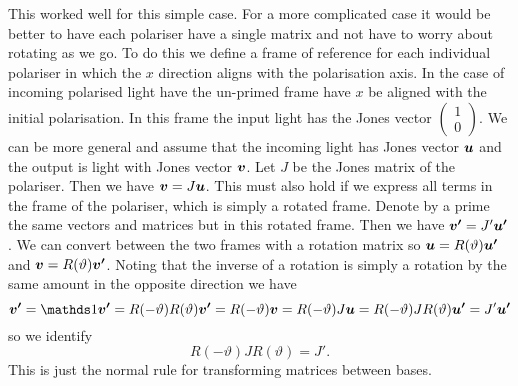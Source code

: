     This worked well for this simple case.
    For a more complicated case it would be better to have each polariser have a single matrix and not have to worry about rotating as we go.
    To do this we define a frame of reference for each individual polariser in which the \(x\) direction aligns with the polarisation axis.
    In the case of incoming polarised light have the un-primed frame have \(x\) be aligned with the initial polarisation.
    In this frame the input light has the Jones vector \(\left( \begin{smallmatrix} 1\\ 0 \end{smallmatrix} \right)\).
    We can be more general and assume that the incoming light has Jones vector \(\bm{u}\) and the output is light with Jones vector \(\bm{v}\).
    Let \(J\) be the Jones matrix of the polariser.
    Then we have \(\bm{v} = J\bm{u}\).
    This must also hold if we express all terms in the frame of the polariser, which is simply a rotated frame.
    Denote by a prime the same vectors and matrices but in this rotated frame.
    Then we have \(\bm{v'} = J'\bm{u'}\).
    We can convert between the two frames with a rotation matrix so \(\bm{u} = R(\vartheta)\bm{u'}\) and \(\bm{v} = R(\vartheta)\bm{v'}\).
    Noting that the inverse of a rotation is simply a rotation by the same amount in the opposite direction we have
    \[\vv{v'} = \ident \vv{v'} = R(-\vartheta)R(\vartheta)\vv{v'} = R(-\vartheta)\vv{v} = R(-\vartheta)J\vv{u} = R(-\vartheta)JR(\vartheta)\vv{u'} = J'\vv{u'}\]
    so we identify
    \[R(-\vartheta)JR(\vartheta) = J'.\]
    This is just the normal rule for transforming matrices between bases.
    
